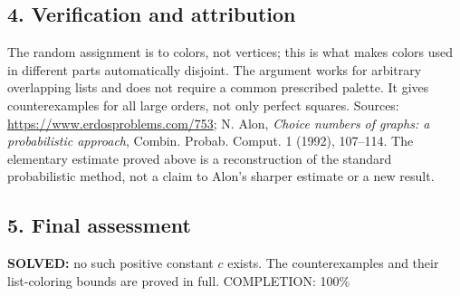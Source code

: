 \subsection*{4. Verification and attribution}
The random assignment is to colors, not vertices; this is what makes colors used in different parts automatically disjoint. The argument works for arbitrary overlapping lists and does not require a common prescribed palette. It gives counterexamples for all large orders, not only perfect squares.
Sources: \url{https://www.erdosproblems.com/753}; N. Alon, \emph{Choice numbers of graphs: a probabilistic approach}, Combin. Probab. Comput. 1 (1992), 107--114. The elementary estimate proved above is a reconstruction of the standard probabilistic method, not a claim to Alon's sharper estimate or a new result.
\subsection*{5. Final assessment}
\textbf{SOLVED:} no such positive constant $c$ exists. The counterexamples and their list-coloring bounds are proved in full.
\noindent COMPLETION: 100\%
